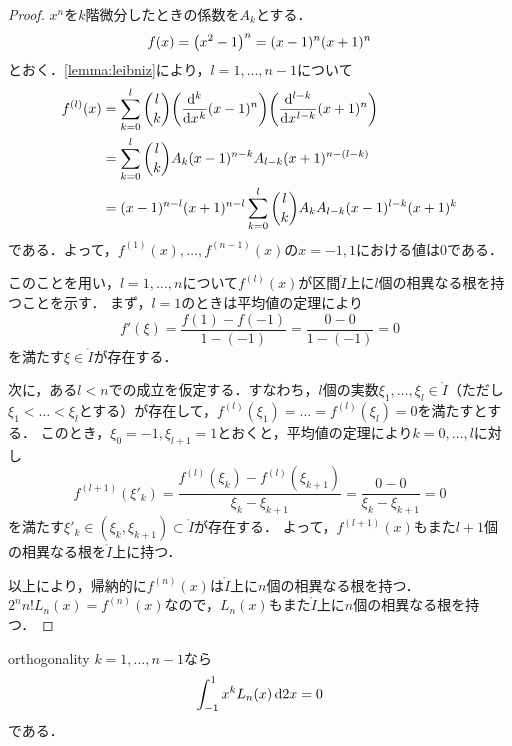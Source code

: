 \documentclass[a4paper]{ltjsarticle}
\theoremstyle{definition}
\DeclarePairedDelimiter{\pqty}{\lparen}{\rparen}
\newcommand{\dd}[1]{\dl2#1}
\begin{document}
\begin{proof}
  $x^n$を$k$階微分したときの係数を$A_k$とする．
  \[
    f(x) = \pqty*{x^2-1}^n = (x-1)^n (x+1)^n
  \]
  とおく．\cref{lemma:leibniz}により，$l=1,\dots,n-1$について
  \begin{align*}
    f^{(l)}(x)
    &= \sum_{k=0}^l \binom{l}{k} \pqty*{\diff*[k]{(x-1)^n}{x}} \pqty*{\diff*[l-k]{(x+1)^n}{x}} \\
    &= \sum_{k=0}^l \binom{l}{k} A_{k} (x-1)^{n-k} A_{l-k} (x+1)^{n-(l-k)} \\
    &= (x-1)^{n-l} (x+1)^{n-l} \sum_{k=0}^l \binom{l}{k} A_{k} A_{l-k} (x-1)^{l-k} (x+1)^k
  \end{align*}
  である．よって，$f^{(1)}(x),\dots,f^{(n-1)}(x)$の$x=-1,1$における値は$0$である．

  このことを用い，$l=1,\dots,n$について$f^{(l)}(x)$が区間$\mathring{I}$上に$l$個の相異なる根を持つことを示す．
  まず，$l=1$のときは平均値の定理により
  \[
    f'(\xi) = \frac{f(1)-f(-1)}{1-(-1)} = \frac{0-0}{1-(-1)}=0
  \]
  を満たす$\xi \in \mathring{I}$が存在する．

  次に，ある$l<n$での成立を仮定する．すなわち，$l$個の実数$\xi_1, \dots, \xi_l \in \mathring{I}$（ただし$\xi_1 < \dots < \xi_l$とする）が存在して，$f^{(l)}(\xi_1) = \dots = f^{(l)}(\xi_l) = 0$を満たすとする．
  このとき，$\xi_0 = -1, \xi_{l+1} = 1$とおくと，平均値の定理により$k=0,\dots,l$に対し
  \[
    f^{(l+1)}(\xi'_k) = \frac{f^{(l)}(\xi_k) - f^{(l)}(\xi_{k+1})}{\xi_k - \xi_{k+1}} = \frac{0 - 0}{\xi_k - \xi_{k+1}} = 0
  \]
  を満たす$\xi'_k \in (\xi_k, \xi_{k+1}) \subset \mathring{I}$が存在する．
  よって，$f^{(l+1)}(x)$もまた$l+1$個の相異なる根を$\mathring{I}$上に持つ．

  以上により，帰納的に$f^{(n)}(x)$は$\mathring{I}$上に$n$個の相異なる根を持つ．
  $2^n n! L_n(x) = f^{(n)}(x)$なので，$L_n(x)$もまた$\mathring{I}$上に$n$個の相異なる根を持つ．
\end{proof}

\begin{theorem}{}{orthogonality}
  $k = 1,\dots,n-1$なら
  \[
    \int_{-1}^1 x^k L_n(x) \dd{x} = 0
  \]
  である．
\end{theorem}
\end{document}
